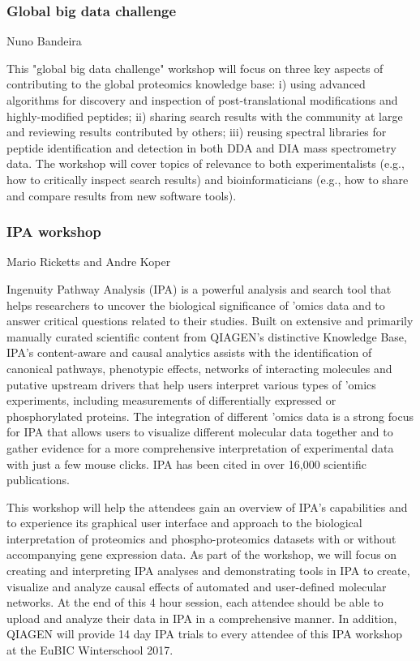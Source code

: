 \subsubsection*{\color{eubicRed} Global big data challenge}
{\color{eubicGray} Nuno Bandeira}

This "global big data challenge" workshop will focus on three key aspects of
contributing to the global proteomics knowledge base: i) using advanced
algorithms for discovery and inspection of post-translational modifications and
highly-modified peptides; ii) sharing search results with the community at large
and reviewing results contributed by others; iii) reusing spectral libraries for
peptide identification and detection in both DDA and DIA mass spectrometry data.
The workshop will cover topics of relevance to both experimentalists (e.g., how
to critically inspect search results) and bioinformaticians (e.g., how to share
and compare results from new software tools).


\subsubsection*{\color{eubicRed} IPA workshop}
{\color{eubicGray} Mario Ricketts and Andre Koper}

Ingenuity\textregistered{} Pathway Analysis (IPA\textregistered{}) is a powerful
analysis and search tool that helps researchers to uncover the biological
significance of 'omics data and to answer critical questions related to their
studies. Built on extensive and primarily manually curated scientific content
from QIAGEN's distinctive Knowledge Base, IPA's content-aware and causal
analytics assists with the identification of canonical pathways, phenotypic
effects, networks of interacting molecules and putative upstream drivers that
help users interpret various types of 'omics experiments, including measurements
of differentially expressed or phosphorylated proteins. The integration of
different 'omics data is a strong focus for IPA that allows users to visualize
different molecular data together and to gather evidence for a more
comprehensive interpretation of experimental data with just a few mouse clicks.
IPA has been cited in over 16,000 scientific publications.

This workshop will help the attendees gain an overview of IPA's capabilities and
to experience its graphical user interface and approach to the biological
interpretation of proteomics and phospho-proteomics datasets with or without
accompanying gene expression data. As part of the workshop, we will focus on
creating and interpreting IPA analyses and demonstrating tools in IPA to create,
visualize and analyze causal effects of automated and user-defined molecular
networks. At the end of this 4 hour session, each attendee should be able to
upload and analyze their data in IPA in a comprehensive manner.  In addition,
QIAGEN will provide 14 day IPA trials to every attendee of this IPA workshop at
the EuBIC Winterschool 2017.


